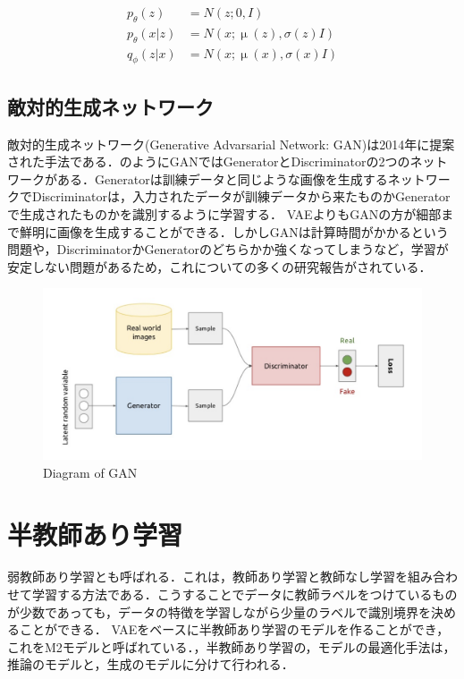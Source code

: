 \begin{align}\label{eq:vae}
p_\theta (z) & = N (z; 0, I)  \\
p_\theta (x|z) & = N (x; \upmu(z), \sigma(z)I) \\
q_\phi (z|x) & = N (x; \upmu(x), \sigma(x)I)
\end{align}


\subsection{敵対的生成ネットワーク}
敵対的生成ネットワーク(Generative Advarsarial Network: GAN)は2014年に提案された手法である．のようにGANではGeneratorとDiscriminatorの2つのネットワークがある．Generatorは訓練データと同じような画像を生成するネットワークでDiscriminatorは，入力されたデータが訓練データから来たものかGeneratorで生成されたものかを識別するように学習する．
VAEよりもGANの方が細部まで鮮明に画像を生成することができる．しかしGANは計算時間がかかるという問題や，DiscriminatorかGeneratorのどちらかか強くなってしまうなど，学習が安定しない問題があるため，これについての多くの研究報告がされている．

\begin{figure}[H]
	\centering
	\includegraphics[width=0.7\linewidth]{fig/generative_adversarial_nets.png}
	\caption{Diagram of GAN}
	\label{fig:GAN}
\end{figure}

\section{半教師あり学習}
弱教師あり学習とも呼ばれる．これは，教師あり学習と教師なし学習を組み合わせて学習する方法である．こうすることでデータに教師ラベルをつけているものが少数であっても，データの特徴を学習しながら少量のラベルで識別境界を決めることができる．
VAEをベースに半教師あり学習のモデルを作ることができ，これをM2モデルと呼ばれている．\cite{M2model}，半教師あり学習の，モデルの最適化手法は，推論のモデルと，生成のモデルに分けて行われる\cite{narayanaswamy2017learning}．

